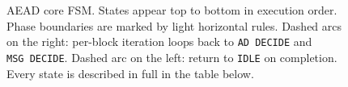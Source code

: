 \documentclass[11pt,a4paper]{article}
\begin{document}
\begin{figure}[H]
\caption{AEAD core FSM. States appear top to bottom in execution order.
Phase boundaries are marked by light horizontal rules.
Dashed arcs on the right: per-block iteration loops back to
\texttt{AD~DECIDE} and \texttt{MSG~DECIDE}.
Dashed arc on the left: return to \texttt{IDLE} on completion.
Every state is described in full in the table below.}
\label{fig:fsm}
\end{figure}
\end{document}
